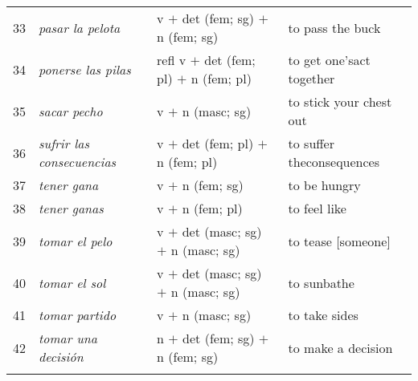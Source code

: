 \documentclass[output=paper]{langsci/langscibook}
\begin{document}
\begin{table}
\begin{tabularx}{\textwidth}{c>{\raggedright}Qlp{3cm}}
33 & \textit{pasar la pelota} & v $+$ det (fem; sg) $+$ n (fem; sg) & to pass the buck \\
34 & \textit{ponerse las pilas} & refl v $+$ det (fem; pl) $+$ n (fem; pl) & to get one's\newline act together \\
35 & \textit{sacar pecho} & v $+$ n (masc; sg) & to stick your chest out \\
36 & \textit{sufrir las consecuencias} & v $+$ det (fem; pl) $+$ n (fem; pl) & to suffer the\newline consequences \\
37 & \textit{tener gana} & v $+$ n (fem; sg) & to be hungry \\
38 & \textit{tener ganas} & v $+$ n (fem; pl) & to feel like \\
39 & \textit{tomar el pelo} & v $+$ det (masc; sg) $+$ n (masc; sg) & to tease {[}someone{]} \\
40 & \textit{tomar el sol} & v $+$ det (masc; sg) $+$ n (masc; sg) & to sunbathe \\
41 & \textit{tomar partido} & v $+$ n (masc; sg) & to take sides \\
42 & \textit{tomar una decisión} & n $+$ det (fem; sg) $+$ n (fem; sg) & to make a decision\\
\lspbottomrule
\end{tabularx}
\end{table}

\clearpage 
\end{document}
